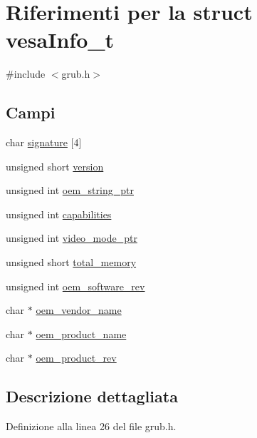 \hypertarget{structvesaInfo__t}{\section{Riferimenti per la struct vesa\+Info\+\_\+t}
\label{structvesaInfo__t}
}


{\ttfamily \#include $<$grub.\+h$>$}

\subsection*{Campi}
\begin{DoxyCompactItemize}
\item 
char \hyperlink{structvesaInfo__t_a48deedd69aeb2ce0d1c27e77f9da23c5}{signature} \mbox{[}4\mbox{]}
\item 
unsigned short \hyperlink{structvesaInfo__t_a6c1001f337933e02a68640cfc7abdfb6}{version}
\item 
unsigned int \hyperlink{structvesaInfo__t_aee5b0eb81a986dc3adadc287dd6809c4}{oem\+\_\+string\+\_\+ptr}
\item 
unsigned int \hyperlink{structvesaInfo__t_a1f4453c48c6629e27fd2e97948deb62b}{capabilities}
\item 
unsigned int \hyperlink{structvesaInfo__t_af4342c2c5c65c802e4a042d324572b9d}{video\+\_\+mode\+\_\+ptr}
\item 
unsigned short \hyperlink{structvesaInfo__t_ab94cc102e07cdfbf3cb53690bf205321}{total\+\_\+memory}
\item 
unsigned int \hyperlink{structvesaInfo__t_af0e5f50889726f62d961141ee8fa06f3}{oem\+\_\+software\+\_\+rev}
\item 
char $\ast$ \hyperlink{structvesaInfo__t_a35b0e91dc1f97ab1f05b8c9a6fe8988f}{oem\+\_\+vendor\+\_\+name}
\item 
char $\ast$ \hyperlink{structvesaInfo__t_a532306633838e6bc58a9e91f69835302}{oem\+\_\+product\+\_\+name}
\item 
char $\ast$ \hyperlink{structvesaInfo__t_a4df6ee9c56e2171999b8346550e2273f}{oem\+\_\+product\+\_\+rev}
\end{DoxyCompactItemize}


\subsection{Descrizione dettagliata}


Definizione alla linea 26 del file grub.\+h.



